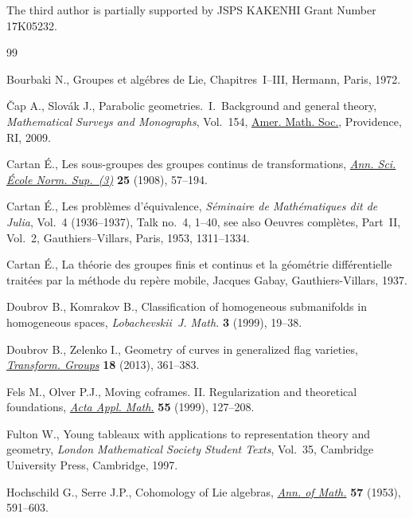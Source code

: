 \documentclass[10pt,a4paper]{amsart}
\numberwithin{equation}{section}
\begin{document}
The third author is partially supported by JSPS KAKENHI Grant Number 17K05232.



\begin{thebibliography}{99}
\footnotesize\itemsep=0pt

Bourbaki N., Groupes et alg\'ebres de Lie, Chapitres~I--III, Hermann, Paris,
 1972.

\v{C}ap A., Slov\'ak J., Parabolic geometries.~{I}.~Background and general
 theory, \textit{Mathematical Surveys and Monographs}, Vol.~154, \href{https://doi.org/10.1090/surv/154}{Amer. Math.
 Soc.}, Providence, RI, 2009.

Cartan \'E., Les sous-groupes des groupes continus de transformations,
 \href{https://doi.org/10.24033/asens.588}{\textit{Ann. Sci. \'Ecole Norm. Sup.~(3)}} \textbf{25} (1908), 57--194.

Cartan \'E., Les probl\`emes d'\'equivalence, \textit{S\'eminaire de
 Math\'ematiques dit de Julia}, Vol.~4 (1936--1937), Talk no.~4, 1--40, see
 also Oeuvres compl\`etes, Part~II, Vol.~2, Gauthiers--Villars, Paris, 1953,
 1311--1334.

Cartan \'E., La th\'eorie des groupes finis et continus et la g\'eom\'etrie
 diff\'erentielle trait\'ees par la m\'ethode du rep\`ere mobile, {J}acques
 Gabay, Gauthiers-Villars, 1937.

Doubrov B., Komrakov B., Classification of homogeneous submanifolds in
 homogeneous spaces, \textit{Lobachevskii~J. Math.} \textbf{3} (1999), 19--38.

Doubrov B., Zelenko I., Geometry of curves in generalized flag varieties,
 \href{https://doi.org/10.1007/s00031-013-9217-x}{\textit{Transform. Groups}} \textbf{18} (2013), 361--383.

Fels M., Olver P.J., Moving coframes. {II}. {R}egularization and theoretical
 foundations, \href{https://doi.org/10.1023/A:1006195823000}{\textit{Acta Appl. Math.}} \textbf{55} (1999), 127--208.

Fulton W., Young tableaux with applications to representation theory and
 geometry, \textit{London Mathematical Society Student Texts}, Vol.~35,
 Cambridge University Press, Cambridge, 1997.

Hochschild G., Serre J.P., Cohomology of {L}ie algebras, \href{https://doi.org/10.2307/1969740}{\textit{Ann. of Math.}}
 \textbf{57} (1953), 591--603.


\end{thebibliography}
\end{document}

